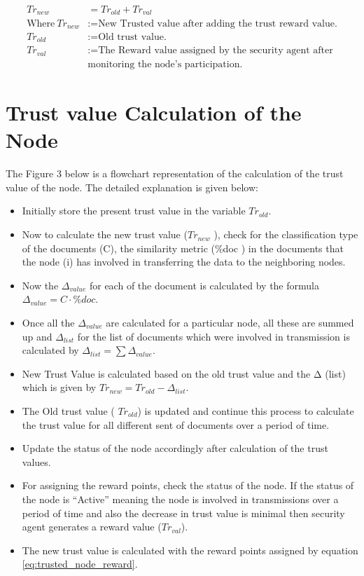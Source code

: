 \begin{equation}
    \label{eq:trusted_node_reward}
    \begin{aligned}
    Tr_{new} &= Tr_{old} + Tr_{val} \\
    \text{Where}~Tr_{new} &:= \text{New Trusted value after adding the trust reward value.} \\
    Tr_{old} &:= \text{Old trust value.} \\
    Tr_{val} &:= \text{The Reward value assigned by the security agent after}\\
                 &\text{monitoring the node's participation.}
\end{aligned}
\end{equation}
 \section{Trust value Calculation of the Node}
The Figure 3 below is a flowchart representation of the calculation of the trust value of the node. The detailed explanation is given below:
\begin{itemize}
    \item Initially store the present trust value in the variable \( Tr_{old} \).
    \item Now to calculate the new trust value (\( Tr_{new} \) ), check for the
    classification type of the documents (C), the similarity metric (\%doc ) in
    the documents that the node (i) has involved in transferring the data to the
    neighboring nodes.  
    \item Now the \( \Delta_{value} \) for each of the document is calculated
    by the formula  \( \Delta_{value} = C \cdot \% doc \).
    \item Once all the \( \Delta_{value} \) are calculated for a particular node, all these are
    summed up and      \( \Delta_{list} \) for the list of documents which were involved in
    transmission is calculated by \( \Delta_{list} = \sum \Delta_{value} \).  
    \item New Trust Value is calculated based on the old trust value and the Δ (list)
        which is given by \( Tr_{new} = Tr_{old} - \Delta_{list} \).
    \item The Old trust value ( \(Tr_{old} \)) is updated and continue this process to
    calculate the trust value for all different sent of documents over a period
    of time.  
    \item Update the status of the node accordingly after calculation of the
    trust values.
    \item For assigning the reward points, check the status of the node. If the status
    of the node is “Active” meaning the node is involved in transmissions over
    a period of time and also the decrease in trust value is minimal then
    security agent generates a reward value      (\( Tr_{val} \)).  
    \item The new trust value is calculated with the reward points assigned by
        equation \ref{eq:trusted_node_reward}.
\end{itemize}

